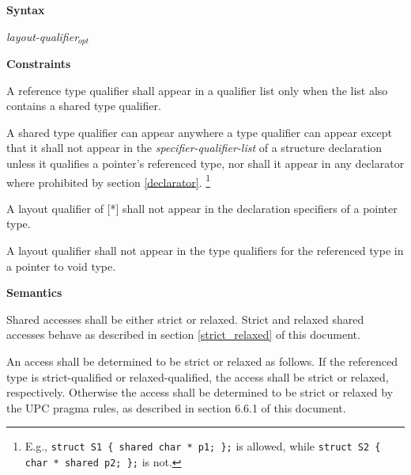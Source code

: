 {\bf Syntax} 


\hspace{3em}{\bf shared} {\em layout-qualifier$_{opt}$}


\hspace{3em}{\bf relaxed}

\hspace{3em}{\bf strict}



\hspace{3em}{\bf [ {\em *}  ]}

{\bf Constraints} 

\np A reference type qualifier shall appear in a qualifier
    list only when the list also contains a shared type qualifier.

\np A shared type qualifier can appear anywhere a type qualifier can appear
    except that it shall not appear in the {\em specifier-qualifier-list} of a structure
    declaration unless it qualifies a pointer's referenced type, nor shall it appear 
    in any declarator where prohibited by section \ref{declarator}.%
    \footnote{E.g., {\tt struct S1 \{ shared char * p1; \};} is allowed,
    while {\tt struct S2 \{ char * shared p2; \};} is not.}

\np A layout qualifier of [*] shall not appear in the
    declaration specifiers of a pointer type.

\np {}

\np A layout qualifier shall not appear in the type
    qualifiers for the referenced type in a pointer to void type.

{\bf Semantics} 

\np Shared accesses shall be either strict or relaxed.
    Strict and relaxed shared accesses behave as described in section
    \ref{strict_relaxed} of this document.

\np An access shall be determined to be strict or relaxed
    as follows.  If the referenced type is strict-qualified or
    relaxed-qualified, the access shall be strict or relaxed,
    respectively.  Otherwise the access shall be determined to be
    strict or relaxed by the UPC pragma rules, as described in section
    6.6.1 of this document.

